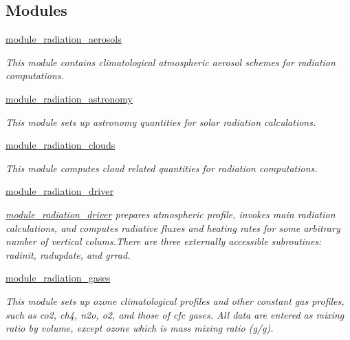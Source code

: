 \subsection*{Modules}
\begin{DoxyCompactItemize}
\item 
\hyperlink{group__module__radiation__aerosols}{module\+\_\+radiation\+\_\+aerosols}
\begin{DoxyCompactList}\small\item\em This module contains climatological atmospheric aerosol schemes for radiation computations. \end{DoxyCompactList}\item 
\hyperlink{group__module__radiation__astronomy}{module\+\_\+radiation\+\_\+astronomy}
\begin{DoxyCompactList}\small\item\em This module sets up astronomy quantities for solar radiation calculations. \end{DoxyCompactList}\item 
\hyperlink{group__module__radiation__clouds}{module\+\_\+radiation\+\_\+clouds}
\begin{DoxyCompactList}\small\item\em This module computes cloud related quantities for radiation computations. \end{DoxyCompactList}\item 
\hyperlink{group__module__radiation__driver}{module\+\_\+radiation\+\_\+driver}
\begin{DoxyCompactList}\small\item\em \hyperlink{namespacemodule__radiation__driver}{module\+\_\+radiation\+\_\+driver} prepares atmospheric profile, invokes main radiation calculations, and computes radiative fluxes and heating rates for some arbitrary number of vertical colums.\+There are three externally accessible subroutines\+: radinit, radupdate, and grrad. \end{DoxyCompactList}\item 
\hyperlink{group__module__radiation__gases}{module\+\_\+radiation\+\_\+gases}
\begin{DoxyCompactList}\small\item\em This module sets up ozone climatological profiles and other constant gas profiles, such as co2, ch4, n2o, o2, and those of cfc gases. All data are entered as mixing ratio by volume, except ozone which is mass mixing ratio (g/g). \end{DoxyCompactList}\item 

\end{DoxyCompactItemize}

